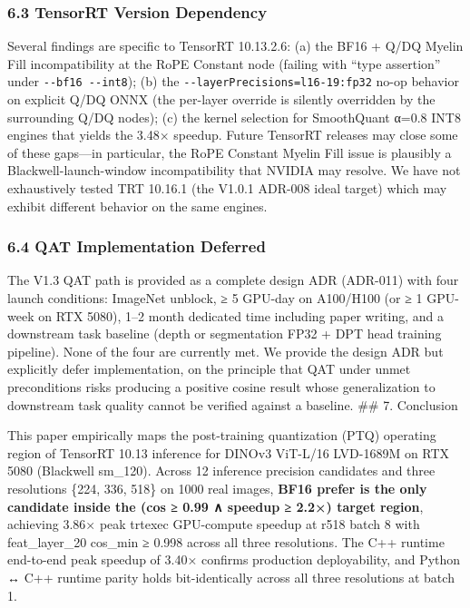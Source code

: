 \documentclass[
]{article}
\begin{document}
\subsubsection{6.3 TensorRT Version
Dependency}\label{tensorrt-version-dependency}

Several findings are specific to TensorRT 10.13.2.6: (a) the BF16 + Q/DQ
Myelin Fill incompatibility at the RoPE Constant node (failing with
``type assertion'' under \texttt{-\/-bf16\ -\/-int8}); (b) the
\texttt{-\/-layerPrecisions=l16-19:fp32} no-op behavior on explicit Q/DQ
ONNX (the per-layer override is silently overridden by the surrounding
Q/DQ nodes); (c) the kernel selection for SmoothQuant α=0.8 INT8 engines
that yields the 3.48× speedup. Future TensorRT releases may close some
of these gaps---in particular, the RoPE Constant Myelin Fill issue is
plausibly a Blackwell-launch-window incompatibility that NVIDIA may
resolve. We have not exhaustively tested TRT 10.16.1 (the V1.0.1 ADR-008
ideal target) which may exhibit different behavior on the same engines.

\subsubsection{6.4 QAT Implementation
Deferred}\label{qat-implementation-deferred}

The V1.3 QAT path is provided as a complete design ADR (ADR-011) with
four launch conditions: ImageNet unblock, ≥ 5 GPU-day on A100/H100 (or ≥
1 GPU-week on RTX 5080), 1--2 month dedicated time including paper
writing, and a downstream task baseline (depth or segmentation FP32 +
DPT head training pipeline). None of the four are currently met. We
provide the design ADR but explicitly defer implementation, on the
principle that QAT under unmet preconditions risks producing a positive
cosine result whose generalization to downstream task quality cannot be
verified against a baseline. \#\# 7. Conclusion

This paper empirically maps the post-training quantization (PTQ)
operating region of TensorRT 10.13 inference for DINOv3 ViT-L/16
LVD-1689M on RTX 5080 (Blackwell sm\_120). Across 12 inference precision
candidates and three resolutions \{224, 336, 518\} on 1000 real images,
\textbf{BF16 prefer is the only candidate inside the (cos ≥ 0.99 ∧
speedup ≥ 2.2×) target region}, achieving 3.86× peak trtexec GPU-compute
speedup at r518 batch 8 with feat\_layer\_20 cos\_min ≥ 0.998 across all
three resolutions. The C++ runtime end-to-end peak speedup of 3.40×
confirms production deployability, and Python ↔ C++ runtime parity holds
bit-identically across all three resolutions at batch 1.
\end{document}
